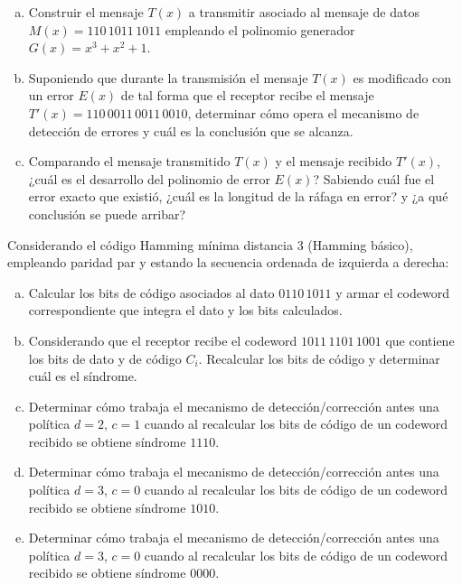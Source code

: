 \documentclass[12pt,a4paper]{article}
\begin{document}
\begin{enumerate}[a)]
	\item Construir el mensaje $T(x)$ a transmitir asociado al mensaje de datos
	$M(x) = 110\,1011\,1011$ empleando el polinomio generador $G(x) = x^3 + x^2 + 1$.

	\item Suponiendo que durante la transmisión el mensaje $T(x)$ es modificado con un error $E(x)$ de tal forma que el receptor recibe el mensaje $T'(x) = 110\,0011\,0011\,0010$, determinar cómo opera el mecanismo de detección de errores y cuál es la conclusión que se alcanza.

	\item Comparando el mensaje transmitido $T(x)$ y el mensaje recibido $T'(x)$, ¿cuál es el desarrollo del polinomio de error $E(x)$? Sabiendo cuál fue el error exacto que existió, ¿cuál es la longitud de la ráfaga en error? y ¿a qué conclusión se puede arribar?
\end{enumerate}


 Considerando el código Hamming mínima distancia 3 (Hamming básico), empleando paridad par y estando la secuencia ordenada de izquierda a derecha:

\begin{enumerate}[a)]

	\item Calcular los bits de código asociados al dato $0110\,1011$ y armar el codeword correspondiente que integra el dato y los bits calculados. 

	\item Considerando que el receptor recibe el codeword $1011\,1101\,1001$ que contiene los bits de dato y de código $C_i$. Recalcular los bits de código y determinar cuál es el síndrome.

	\item Determinar cómo trabaja el mecanismo de detección/corrección antes una política $d=2$, $c=1$ cuando al recalcular los bits de código de un codeword recibido se obtiene síndrome $1110$.

	\item Determinar cómo trabaja el mecanismo de detección/corrección antes una política $d=3$, $c=0$ cuando al recalcular los bits de código de un codeword recibido se obtiene síndrome $1010$.

	\item Determinar cómo trabaja el mecanismo de detección/corrección antes una política $d=3$, $c=0$ cuando al recalcular los bits de código de un codeword recibido se obtiene síndrome $0000$.

\end{enumerate}
\end{document}
